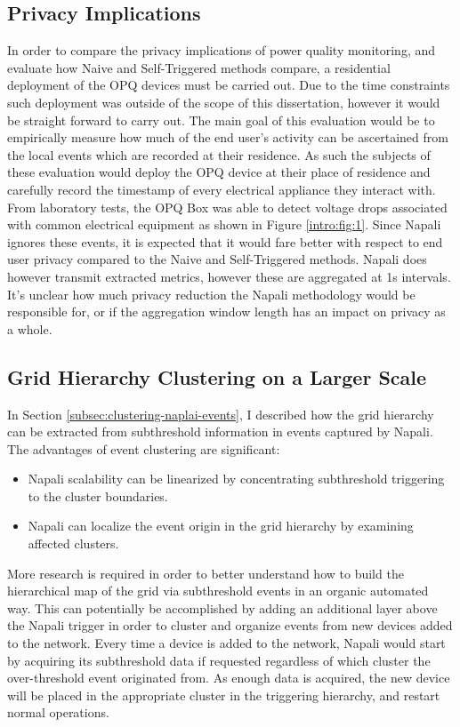 \subsection{Privacy Implications}\label{subsec:privacy-implications}
In order to compare the privacy implications of power quality monitoring, and evaluate how Naive and Self-Triggered methods compare, a residential deployment of the OPQ devices must be carried out.
Due to the time constraints such deployment was outside of the scope of this dissertation, however it would be straight forward to carry out.
The main goal of this evaluation would be to empirically measure how much of the end user's activity can be ascertained from the local events which are recorded at their residence.
As such the subjects of these evaluation would deploy the OPQ device at their place of residence and carefully record the timestamp of every electrical appliance they interact with.
From laboratory tests, the OPQ Box was able to detect voltage drops associated with common electrical equipment as shown in Figure \ref{intro:fig:1}.
Since Napali ignores these events, it is expected that it would fare better with respect to end user privacy compared to the Naive and Self-Triggered methods.
Napali does however transmit extracted metrics, however these are aggregated at 1s intervals.
It's unclear how much privacy reduction the Napali methodology would be responsible for, or if the aggregation window length has an impact on privacy as a whole.

\subsection{Grid Hierarchy Clustering on a Larger Scale}\label{subsec:grid-hierarchy-clustering-on-a-larger-scale}
In Section \ref{subsec:clustering-naplai-events}, I described how the grid hierarchy can be extracted from subthreshold information in events captured by Napali.
The advantages of event clustering are significant:
\begin{itemize}
    \item Napali scalability can be linearized by concentrating subthreshold triggering to the cluster boundaries.
    \item Napali can localize the event origin in the grid hierarchy by examining affected clusters.
\end{itemize}

More research is required in order to better understand how to build the hierarchical map of the grid via subthreshold events in an organic automated way.
This can potentially be accomplished by adding an additional layer above the Napali trigger in order to cluster and organize events from new devices added to the network.
Every time a device is added to the network, Napali would start by acquiring its subthreshold data if requested regardless of which cluster the over-threshold event originated from.
As enough data is acquired, the new device will be placed in the appropriate cluster in the triggering hierarchy, and restart normal operations.

